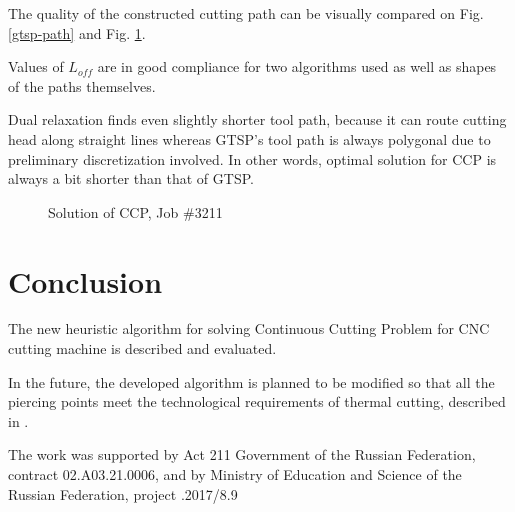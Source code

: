 \documentclass{ifacconf}
\begin{document}
The quality of the constructed
cutting path can be visually compared
on Fig. \ref{gtsp-path} and Fig. \ref{ccp-path}.

Values of $L_{off}$ are in good compliance for two algorithms used
as well as shapes of the paths themselves.

Dual relaxation finds even slightly shorter tool path,
because it can route cutting head along straight lines
whereas GTSP's tool path is always polygonal
due to preliminary discretization involved.
In other words,
optimal solution for CCP is always a bit shorter
than that of GTSP.

\begin{figure}
  \caption{Solution of CCP, Job \#3211}
  \label{ccp-path}
\end{figure}

\section{Conclusion}

The new heuristic algorithm
for solving
Continuous Cutting Problem
for CNC cutting machine
is described and evaluated.

In the future,
the developed algorithm is planned
to be modified
so that all the piercing points
meet the technological requirements of thermal cutting,
described in
\cite{petunin2016optimization}.

\begin{ack}
The work was supported by
Act 211 Government of the Russian Federation,
contract \textnumero 02.A03.21.0006,
and by Ministry of Education and Science
of the Russian Federation,
project .2017/8.9
\end{ack}

\end{document}
